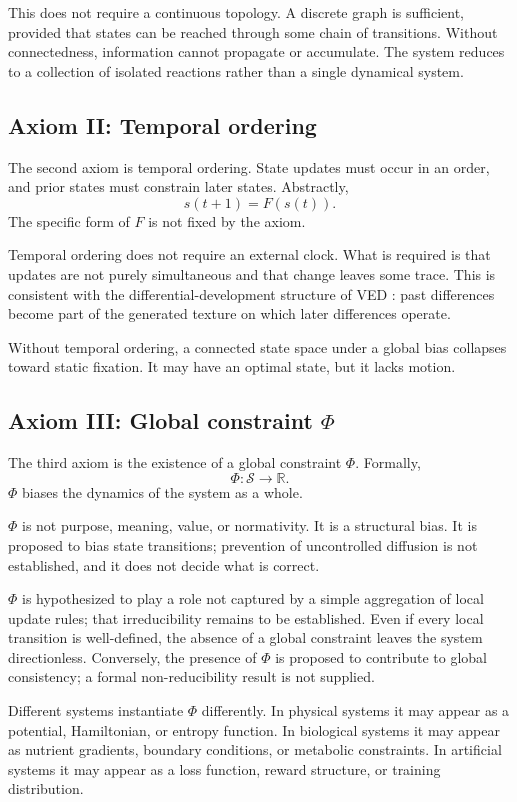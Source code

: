 This does not require a continuous topology. A discrete graph is sufficient, provided that states can be reached through some chain of transitions. Without connectedness, information cannot propagate or accumulate. The system reduces to a collection of isolated reactions rather than a single dynamical system.

\subsection{Axiom II: Temporal ordering}

The second axiom is temporal ordering. State updates must occur in an order, and prior states must constrain later states. Abstractly,
\[
s(t+1)=F(s(t)).
\]
The specific form of $F$ is not fixed by the axiom.

Temporal ordering does not require an external clock. What is required is that updates are not purely simultaneous and that change leaves some trace. This is consistent with the differential-development structure of VED \citep{VEDVol1}: past differences become part of the generated texture on which later differences operate.

Without temporal ordering, a connected state space under a global bias collapses toward static fixation. It may have an optimal state, but it lacks motion.

\subsection{Axiom III: Global constraint $\Phi$}

The third axiom is the existence of a global constraint $\Phi$. Formally,
\[
\Phi:\mathcal{S}\rightarrow\mathbb{R}.
\]
\(\Phi\) biases the dynamics of the system as a whole.

\(\Phi\) is not purpose, meaning, value, or normativity. It is a structural bias. It is proposed to bias state transitions; prevention of uncontrolled diffusion is not established, and it does not decide what is correct.

\(\Phi\) is hypothesized to play a role not captured by a simple aggregation of local update rules; that irreducibility remains to be established. Even if every local transition is well-defined, the absence of a global constraint leaves the system directionless. Conversely, the presence of $\Phi$ is proposed to contribute to global consistency; a formal non-reducibility result is not supplied.

Different systems instantiate $\Phi$ differently. In physical systems it may appear as a potential, Hamiltonian, or entropy function. In biological systems it may appear as nutrient gradients, boundary conditions, or metabolic constraints. In artificial systems it may appear as a loss function, reward structure, or training distribution.

